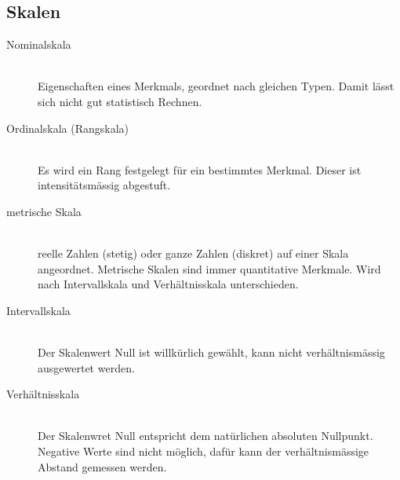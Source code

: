 \subsection{Skalen}
\begin{description}
	\item[Nominalskala] \hfill \\
		Eigenschaften eines Merkmals, geordnet nach gleichen Typen. Damit lässt sich nicht gut statistisch Rechnen.
		
	\item[Ordinalskala (Rangskala)] \hfill \\
		Es wird ein Rang festgelegt für ein bestimmtes Merkmal. Dieser ist intensitätsmässig abgestuft.
		
	\item[metrische Skala] \hfill \\
		reelle Zahlen (stetig) oder ganze Zahlen (diskret) auf einer Skala angeordnet. Metrische Skalen sind immer quantitative Merkmale.
		Wird nach Intervallskala und Verhältnisskala unterschieden.
		
	\item[Intervallskala] \hfill \\
		Der Skalenwert Null ist willkürlich gewählt, kann nicht verhältnismässig ausgewertet werden.
	
	\item[Verhältnisskala] \hfill \\
		Der Skalenwret Null entspricht dem natürlichen absoluten Nullpunkt. Negative Werte sind nicht möglich, dafür kann der verhältnismässige Abstand gemessen werden.
\end{description}

